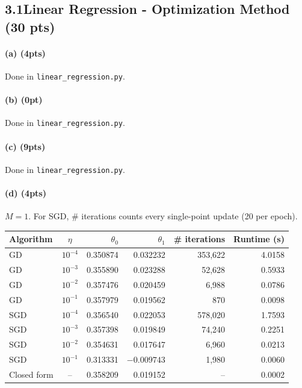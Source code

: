 \documentclass[11pt]{article}
\begin{document}
\subsection*{3.1\quad Linear Regression - Optimization Method (30 pts)}

\paragraph{(a) (4pts)} Done in \texttt{linear\_regression.py}.

\paragraph{(b) (0pt)} Done in \texttt{linear\_regression.py}.

\paragraph{(c) (9pts)} Done in \texttt{linear\_regression.py}.

\paragraph{(d) (4pts)} $M=1$. For SGD, \# iterations counts every single-point update (20 per epoch).
\begin{center}\small
\begin{tabular}{lcrrrr}
\toprule
Algorithm & $\eta$ & $\theta_0$ & $\theta_1$ & \# iterations & Runtime (s)\\\midrule
GD  & $10^{-4}$ & 0.350874 & 0.032232  & 353{,}622 & 4.0158\\
GD  & $10^{-3}$ & 0.355890 & 0.023288  & 52{,}628  & 0.5933\\
GD  & $10^{-2}$ & 0.357476 & 0.020459  & 6{,}988   & 0.0786\\
GD  & $10^{-1}$ & 0.357979 & 0.019562  & 870       & 0.0098\\
SGD & $10^{-4}$ & 0.356540 & 0.022053  & 578{,}020 & 1.7593\\
SGD & $10^{-3}$ & 0.357398 & 0.019849  & 74{,}240  & 0.2251\\
SGD & $10^{-2}$ & 0.354631 & 0.017647  & 6{,}960   & 0.0213\\
SGD & $10^{-1}$ & 0.313331 & $-0.009743$ & 1{,}980 & 0.0060\\
Closed form & -- & 0.358209 & 0.019152 & -- & 0.0002\\\bottomrule
\end{tabular}
\end{center}
\end{document}
